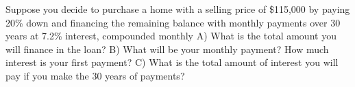 \documentclass[11pt,epsfig]{article}
\begin{document}
\begin{problem}{12}
Suppose you decide to purchase a home with a selling price of \$115,000 by paying 20\% down and financing the remaining balance with monthly payments over 30 years at 7.2\% interest, compounded monthly
\newline
A) What is the total amount you will finance in the loan?
\newline
B) What will be your monthly payment? How much interest is your first payment?
\newline
C) What is the total amount of interest you will pay if you make the 30 years of payments?


\vfill
\end{problem}



\showpoints
\end{document}
